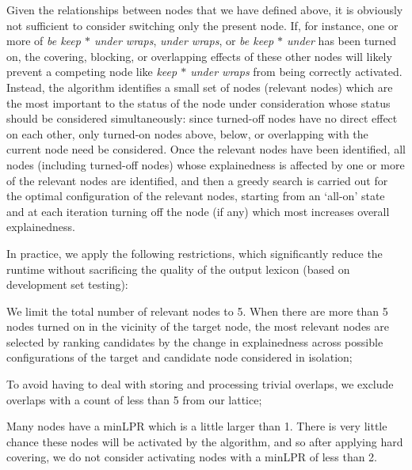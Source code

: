 \documentclass[11pt,letterpaper]{article}
\newcommand{\gap}{$*$\xspace}
\newcommand{\ex}[1]{\textit{#1}\xspace}
\begin{document}
Given the relationships between nodes that we have defined above, it is obviously not sufficient to consider switching only the present node. If, for instance, one or more of \ex{be keep \gap under wraps}, \ex{under wraps}, or \ex{be keep \gap under} has been turned on, the covering, blocking, or overlapping effects of these other nodes will likely prevent a competing node like \ex{keep \gap under wraps} from being correctly activated. Instead, the algorithm identifies a small set of nodes (relevant nodes) which are the most important to the status of the node under consideration whose status should be considered simultaneously: since turned-off nodes have no direct effect on each other, only turned-on nodes above, below, or overlapping with the current node need be considered.  Once the relevant nodes have been identified, all nodes (including turned-off nodes) whose explainedness is affected by one or more of the relevant nodes are identified, and then a greedy search is carried out for the optimal configuration of the relevant nodes, starting from an `all-on' state and at each iteration turning off the node (if any) which most increases overall explainedness.

In practice, we apply the following restrictions, which significantly reduce the runtime without sacrificing the quality of the output lexicon (based on development set testing):
\begin{compactitem}
\item We limit the total number of relevant nodes to 5. When there are more than 5 nodes turned on in the vicinity of the target node, the most relevant nodes are selected by ranking candidates by the change in explainedness across possible configurations of the target and candidate node considered in isolation;
\item To avoid having to deal with storing and processing trivial overlaps, we exclude overlaps with a count of less than 5 from our lattice;
\item Many nodes have a minLPR which is a little larger than 1. There is very little chance these nodes will be activated by the algorithm, and so after applying hard covering, we do not consider activating nodes with a minLPR of less than 2.
\end{compactitem}
\end{document}
